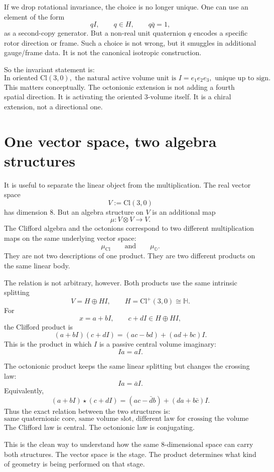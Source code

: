 \documentclass[11pt]{article}
\newcommand{\Cl}{\mathrm{Cl}}
\newcommand{\OO}{\mathbb O}
\begin{document}
If we drop rotational invariance, the choice is no longer unique. One can use
an element of the form
\[
qI,
\qquad q\in H,
\qquad q\bar q=1,
\]
as a second-copy generator. But a non-real unit quaternion $q$ encodes a
specific rotor direction or frame. Such a choice is not wrong, but it smuggles
in additional gauge/frame data. It is not the canonical isotropic construction.

So the invariant statement is:
\[
\boxed{
\text{In oriented }\Cl(3,0),\text{ the natural active volume unit is }I=e_1e_2e_3,
\text{ unique up to sign.}
}
\]
This matters conceptually. The octonionic extension is not adding a fourth
spatial direction. It is activating the oriented $3$-volume itself. It is a
chiral extension, not a directional one.

\section{One vector space, two algebra structures}

It is useful to separate the linear object from the multiplication. The real
vector space
\[
V:=\Cl(3,0)
\]
has dimension $8$. But an algebra structure on $V$ is an additional map
\[
\mu:V\otimes V\to V.
\]
The Clifford algebra and the octonions correspond to two different
multiplication maps on the same underlying vector space:
\[
\mu_{\Cl}
\qquad\text{and}\qquad
\mu_{\OO}.
\]
They are not two descriptions of one product. They are two different products
on the same linear body.

The relation is not arbitrary, however. Both products use the same intrinsic
splitting
\[
V=H\oplus HI,
\qquad
H=\Cl^+(3,0)\cong\mathbb H.
\]
For
\[
x=a+bI,
\qquad
c+dI\in H\oplus HI,
\]
the Clifford product is
\[
(a+bI)(c+dI)
=
(ac-bd)+(ad+bc)I.
\]
This is the product in which $I$ is a passive central volume imaginary:
\[
Ia=aI.
\]

The octonionic product keeps the same linear splitting but changes the crossing
law:
\[
Ia=\bar a I.
\]
Equivalently,
\[
(a+bI)\star(c+dI)
=
(ac-\bar d b)+(da+b\bar c)I.
\]
Thus the exact relation between the two structures is:
\[
\boxed{
\text{same quaternionic core, same volume slot, different law for crossing the volume slot.}
}
\]
The Clifford law is central. The octonionic law is conjugating.

This is the clean way to understand how the same $8$-dimensional space can
carry both structures. The vector space is the stage. The product determines
what kind of geometry is being performed on that stage.
\end{document}
